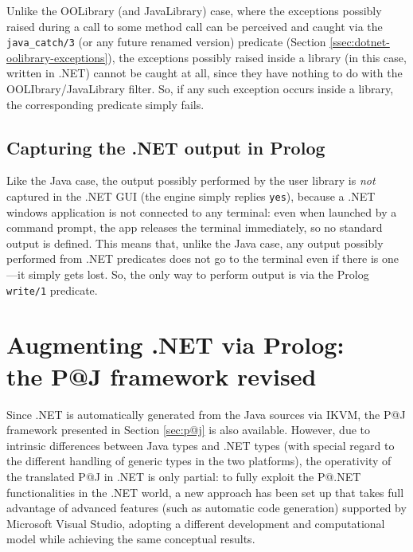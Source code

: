 Unlike the OOLibrary (and JavaLibrary) case, where the exceptions possibly raised during a call to some method call can be perceived and caught via the \texttt{java\_catch/3} (or any future renamed version) predicate (Section \ref{ssec:dotnet-oolibrary-exceptions}), the exceptions possibly raised inside a library (in this case, written in .NET) cannot be caught at all, since they have nothing to do with the OOLIbrary/JavaLibrary filter.
So, if any such exception occurs inside a library, the corresponding predicate simply fails.

\subsection{Capturing the .NET output in Prolog}

Like the Java case, the output possibly performed by the user library is \textit{not} captured in the \tuprolog{}.NET GUI (the engine simply replies \texttt{yes}), because a .NET windows application is not connected to any terminal: even when launched by a command prompt, the app releases the terminal immediately, so no standard output is defined.
This means that, unlike the Java case, any output possibly performed from .NET predicates does not go to the terminal even if there is one---it simply gets lost. So, the only way to perform output is via the Prolog \texttt{write/1} predicate.



\section{Augmenting .NET via Prolog:\\the P@J framework revised}
\label{sec:dotnet-pj}

Since \tuprolog{}.NET is automatically generated from the Java sources via IKVM, the P@J framework presented in Section \ref{sec:p@j} is also available.
%
However, due to intrinsic differences between Java types and .NET types (with special regard to the different handling of generic types in the two platforms), the operativity of the translated P@J in .NET is only partial: to fully exploit the P@.NET functionalities in the .NET world, a new approach has been set up that takes full advantage of advanced features (such as automatic code generation) supported by Microsoft Visual Studio, adopting a different development and computational model while achieving the same conceptual results.

